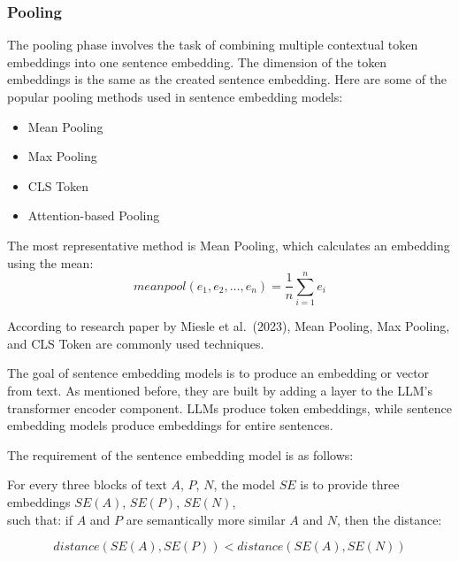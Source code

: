 \documentclass{wseas}
\begin{document}
\subsubsection{Pooling}

The pooling phase involves the task of combining multiple contextual
token embeddings into one sentence embedding. The dimension of the token
embeddings is the same as the created sentence embedding. Here are some
of the popular pooling methods used in sentence embedding models:

\begin{itemize}

\item
  Mean Pooling
\item
  Max Pooling
\item
  CLS Token
\item
  Attention-based Pooling
\end{itemize}

The most representative method is Mean Pooling, which calculates an
embedding using the mean:
\begin{equation}
  meanpool(e_1, e_2, \ldots, e_n) = \frac{1}{n} \sum_{i=1}^{n} e_i
\end{equation}

According to research paper \cite{cite5} by Miesle et al.~(2023), Mean
Pooling, Max Pooling, and CLS Token are commonly used techniques.

The goal of sentence embedding models is to produce an embedding or
vector from text. As mentioned before, they are built by adding a layer
to the LLM's transformer encoder component. LLMs produce token
embeddings, while sentence embedding models produce embeddings for
entire sentences.

The requirement of the sentence embedding model is as follows:

For every three blocks of text \(A\), \(P\), \(N\), the model \(SE\) is
to provide three embeddings \(SE(A)\), \(SE(P)\), \(SE(N)\),\\
such that: if \(A\) and \(P\) are semantically more similar \(A\) and
\(N\), then the distance: 

\begin{equation}
   distance(SE(A), SE(P)) < distance(SE(A), SE(N))
\end{equation}
\end{document}
